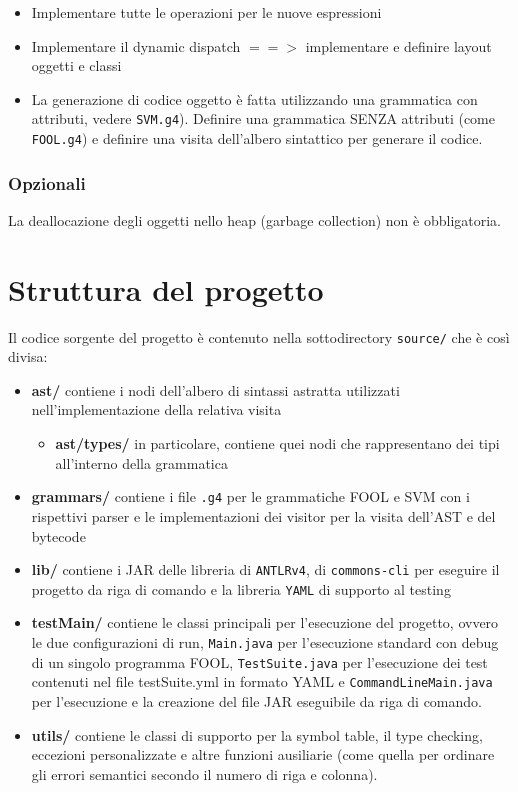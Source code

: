 \documentclass[a4paper]{article}   %
\begin{document}
\begin{itemize}
  \item Implementare tutte le operazioni per le nuove espressioni
  \item Implementare il dynamic dispatch $==>$ implementare e definire layout oggetti e classi
  \item La generazione di codice oggetto è fatta utilizzando una grammatica con attributi,
vedere \lstinline|SVM.g4|).
Definire una grammatica SENZA attributi (come \lstinline|FOOL.g4|) e definire una visita
dell'albero sintattico per generare il codice.
\end{itemize}

\subsubsection{Opzionali}
La deallocazione degli oggetti nello heap (garbage collection) non è obbligatoria.

\section{Struttura del progetto}
Il codice sorgente del progetto è contenuto nella sottodirectory \lstinline|source/| che è così divisa:

\begin{itemize}
  \item \textbf{ast/} contiene i nodi dell'albero di sintassi astratta utilizzati nell'implementazione della relativa visita
  \begin{itemize}
    \item \textbf{ast/types/}
    in particolare, contiene quei nodi che rappresentano dei tipi all'interno della grammatica
  \end{itemize}
  \item \textbf{grammars/}
    contiene i file \lstinline|.g4| per le grammatiche FOOL e SVM con i rispettivi parser e le implementazioni dei visitor per la visita dell'AST e del bytecode
  \item \textbf{lib/}
    contiene i JAR delle libreria di \lstinline|ANTLRv4|, di \lstinline|commons-cli| per eseguire il progetto da riga di comando
    e la libreria \lstinline|YAML| di supporto al testing
  \item \textbf{testMain/}
    contiene le classi principali per l'esecuzione del progetto, ovvero le
    due configurazioni di run, \lstinline|Main.java| per l'esecuzione standard con debug di un singolo programma FOOL, \lstinline|TestSuite.java| per l'esecuzione dei test contenuti nel file testSuite.yml in formato YAML e \lstinline|CommandLineMain.java| per l'esecuzione e la creazione del file JAR eseguibile da riga di comando.
  \item \textbf{utils/}
    contiene le classi di supporto per la symbol table, il type checking, eccezioni personalizzate e altre funzioni ausiliarie (come quella per ordinare gli errori semantici secondo il numero di riga e colonna).

\end{itemize}
\end{document}
